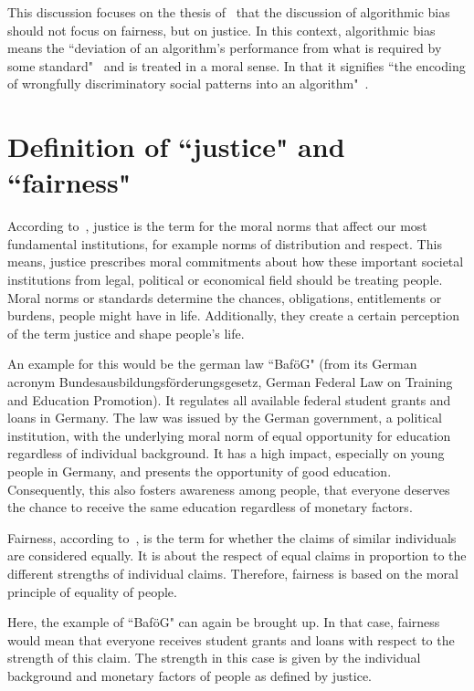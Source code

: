 
This discussion focuses on the thesis of~\cite{vredenburgh} that the discussion of algorithmic bias should not focus on fairness, but on justice.
In this context, algorithmic bias means the ``deviation of an algorithm’s performance from what is required by some standard"~\parencite[][1]{vredenburgh} and is treated in a moral sense.
In that it signifies ``the encoding of wrongfully discriminatory social patterns into an algorithm"~\parencite[][2]{vredenburgh}.

\section*{Definition of ``justice" and ``fairness" }

According to~\cite[][3, 11--12]{vredenburgh}, justice is the term for the moral norms that affect our most fundamental institutions, for example norms of distribution and respect.
This means, justice prescribes moral commitments about how these important societal institutions from legal, political or economical field should be treating people.
Moral norms or standards determine the chances, obligations, entitlements or burdens, people might have in life.
Additionally, they create a certain perception of the term justice and shape people's life.

An example for this would be the german law ``BaföG" (from its German acronym Bundesausbildungsförderungsgesetz, German Federal Law on Training and Education Promotion).
It regulates all available federal student grants and loans in Germany.
The law was issued by the German government, a political institution, with the underlying moral norm of equal opportunity for education regardless of individual background.
It has a high impact, especially on young people in Germany, and presents the opportunity of good education.
Consequently, this also fosters awareness among people, that everyone deserves the chance to receive the same education regardless of monetary factors.

Fairness, according to~\cite[][3, 13]{vredenburgh}, is the term for whether the claims of similar individuals are considered equally.
It is about the respect of equal claims in proportion to the different strengths of individual claims.
Therefore, fairness is based on the moral principle of equality of people.

Here, the example of ``BaföG" can again be brought up.
In that case, fairness would mean that everyone receives student grants and loans with respect to the strength of this claim.
The strength in this case is given by the individual background and monetary factors of people as defined by justice.

